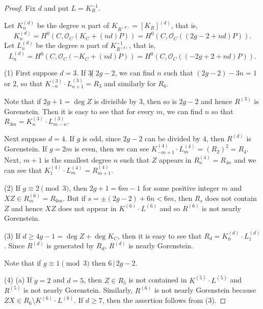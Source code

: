 \documentclass[12pt]{amsart}
\theoremstyle{definition}
\theoremstyle{remark}
\numberwithin{equation}{section}
\newcommand{\cO}{\mathcal O}
\renewcommand{\:}{\colon}
\begin{document}
\begin{proof} 
Fix $d$ and put $L=K_R^{-1}$. 
\par
Let $K^{(d)}_n$ be the degree $n$ part of 
$K_{R^{(d)}}= [K_R]^{(d)}$, that is, 
\[
K^{(d)}_n=H^0(C, \cO_C(K_C + (nd)P)) = 
H^0(C, \cO_C((2g-2+ nd)P)). 
\]
Let  $L^{(d)}_n$  be the degree $n$ part of 
$K^{-1}_{R^{(d)}}$, that is, 
\[
L^{(d)}_n=H^0(C, \cO_C(-K_C + (nd)P)) = 
H^0(C, \cO_C((-2g+2+ nd)P)). 
\]

\par
(1) First suppose $d=3$. 
If $3 \not | \; 2g-2$, we can find $n$ such that $(2g-2) - 3n = 1$ or $2$, so that
$ K^{(3)}_{-n} \cdot L^{(3)}_{n+1} = R_3$ and similarly for $R_6$. 
\par
Note that if  $2g+1 = \deg Z$ is divisible by $3$, then so is $2g-2$ and hence 
$R^{(3)}$ is Gorenstein. Then it is easy to see that for every $m$, 
we can find $n$ so that $R_{3m} = K^{(3)}_n\cdot  L^{(3)}_{m-n}$. 
\par \vspace{1mm}
Next suppose $d=4$. If $g$ is odd, since $2g-2$ can be 
divided by $4$, then $R^{(d)}$ is Gorenstein. 
If $g=2m$ is even, then we can see $K^{(4)}_{-m+1}\cdot L^{(4)}_{m} = (R_2)^2 =R_4$.
Next, $m+1$ is the smallest degree $n$ such that $Z$ appears in 
$ R^{(4)}_{n} = R_{4n}$ and 
we can see that $K^{(4)}_{1}\cdot L^{(4)}_{m}= R^{(4)}_{m+1}$.  

\par \vspace{1mm}
(2) If $g \equiv 2 \pmod{3}$, then $2g + 1 = 6m -1$ for some positive integer $m$ 
and $XZ \in R^{(6)}_m = R_{6m}$.  But if $s= \pm (2g-2) + 6n < 6m$, then $R_s$ does not 
contain $Z$ and hence $XZ$ does not appear in $K^{(6)} \cdot  L^{(6)}$ and so $R^{(6)}$ is not nearly Gorenstein.  

\par \vspace{1mm}
(3) If $d \ge 4g-1 = \deg Z + \deg K_C$, then it is easy to see that 
$R_d = K^{(d)}_{0}\cdot L^{(d)}_{1}$. Since   $R^{(d)}$ is generated by $R_d$, 
$R^{(d)}$ is nearly Gorenstein.  
\par 
Note that if $g \equiv 1 \pmod{3}$ then $6 \,|\, 2g-2$.  
\par \vspace{1mm}
(4) (a) If $g =2$ and $d=5$, then $Z \in R_5$ is not contained in 
$K^{(5)} \cdot  L^{(5)}$
and $R^{(5)}$ is not nearly Gorenstein. 
Similarly, $R^{(6)}$ is not nearly Gorenstein because 
$ZX \in R_6 \setminus  K^{(6)} \cdot  L^{(6)}$. 
If $d\ge 7$,  then the assertion follows from (3). 


\end{proof}
\end{document}
